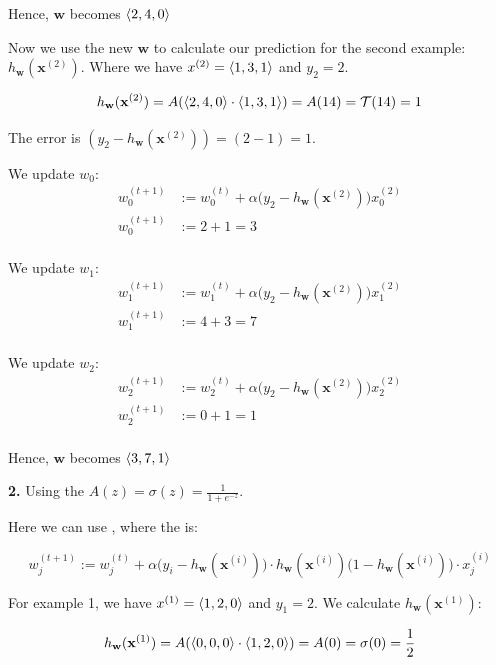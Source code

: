 Hence, $\mathbf{w}$ becomes $\left\langle 2,4,0 \right\rangle$

Now we use the new $\mathbf{w}$ to calculate our prediction for the second example: $h_{\mathbf{w}}(\mathbf{x}^{(2)})$. Where we have $x^{(2)} = \left\langle 1, 3, 1 \right\rangle$ and $y_2 = 2$.

\[
h_{\mathbf{w}}(\mathbf{x}^{(2)}) = A(\left\langle 2,4,0 \right\rangle \cdot \left\langle 1, 3, 1 \right\rangle) = A(14) = \mathcal{T}(14) = 1
\]

The error is $(y_2 - h_{\mathbf{w}}(\mathbf{x}^{(2)})) = (2 - 1) = 1$.

We update $w_0$:
\begin{align*}
w_0^{(t+1)} &:= w_0^{(t)} + \alpha \big(y_2 - h_{\mathbf{w}}(\mathbf{x}^{(2)})\big) x_0^{(2)} \\
w_0^{(t+1)} &:= 2 + 1 = 3 \\
\end{align*}

We update $w_1$:
\begin{align*}
w_1^{(t+1)} &:= w_1^{(t)} + \alpha \big(y_2 - h_{\mathbf{w}}(\mathbf{x}^{(2)})\big) x_1^{(2)} \\
w_1^{(t+1)} &:= 4 + 3 = 7 \\
\end{align*}

We update $w_2$:
\begin{align*}
w_2^{(t+1)} &:= w_2^{(t)} + \alpha \big(y_2 - h_{\mathbf{w}}(\mathbf{x}^{(2)})\big) x_2^{(2)} \\
w_2^{(t+1)} &:= 0 + 1 = 1 \\
\end{align*}

Hence, $\mathbf{w}$ becomes $\left\langle 3,7,1 \right\rangle$


\textbf{2. } Using the  $A(z) = \sigma(z) = \frac{1}{1+e^{-z}}$.

Here we can use , where the  is:

\[
w_j^{(t+1)} := w_j^{(t)} + \alpha \big(y_i - h_{\mathbf{w}}(\mathbf{x}^{(i)})\big) \cdot h_{\mathbf{w}}(\mathbf{x}^{(i)})\big(1 - h_{\mathbf{w}}(\mathbf{x}^{(i)})\big) \cdot x_j^{(i)}
\]

For example 1, we have $x^{(1)} = \left\langle 1, 2, 0 \right\rangle$ and $y_1 = 2$. We calculate $h_{\mathbf{w}}(\mathbf{x}^{(1)})$:

\[
h_{\mathbf{w}}(\mathbf{x}^{(1)}) = A(\left\langle 0,0,0 \right\rangle \cdot \left\langle 1, 2, 0 \right\rangle) = A(0) = \sigma(0) = \frac{1}{2}
\]

